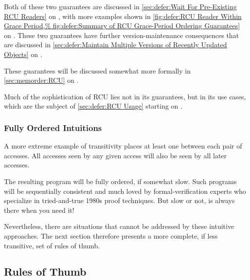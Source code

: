 Both of these two guarantees are discussed in
\cref{sec:defer:Wait For Pre-Existing RCU Readers}
on
,
with more examples shown in
\cref{fig:defer:RCU Reader Within Grace Period,%
fig:defer:Summary of RCU Grace-Period Ordering Guarantees}
on
.
These two guarantees have further version-maintenance consequences that
are discussed in
\cref{sec:defer:Maintain Multiple Versions of Recently Updated Objects}
on
.

These guarantees will be discussed somewhat more formally in
\cref{sec:memorder:RCU}
on
.

Much of the sophistication of RCU lies not in its guarantees, but in its
use cases, which are the subject of
\cref{sec:defer:RCU Usage}
starting on
.

\subsubsection{Fully Ordered Intuitions}
\label{sec:memorder:Fully Ordered Intuitions}

A more extreme example of transitivity places at least one 
between each pair of accesses.
All accesses seen by any given access will also be seen by all later
accesses.

The resulting program will be fully ordered, if somewhat slow.
Such programs will be sequentially consistent and much loved by
formal-verification experts who specialize in tried-and-true 1980s
proof techniques.
But slow or not,  is always there when you need it!

Nevertheless, there are situations that cannot be addressed by these
intuitive approaches.
The next section therefore presents a more complete, if less transitive,
set of rules of thumb.

\subsection{Rules of Thumb}
\label{sec:memorder:Rules of Thumb}

